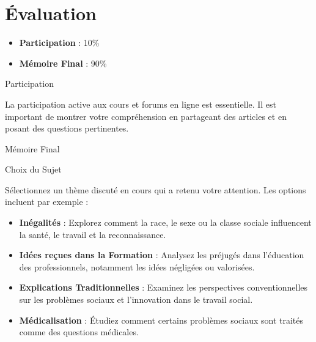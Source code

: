 \documentclass[
  letterpaper,
  DIV=11,
  numbers=noendperiod]{scrreprt}
\providecommand{\tightlist}{%
  \setlength{\itemsep}{0pt}\setlength{\parskip}{0pt}}\usepackage{longtable,booktabs,array}
\newlength{\cslhangindent}
\newenvironment{CSLReferences}[2] %
 {\begin{list}{}{%
  \setlength{\itemindent}{0pt}
  \setlength{\leftmargin}{0pt}
  \setlength{\parsep}{0pt}
  \ifodd #1
   \setlength{\leftmargin}{\cslhangindent}
   \setlength{\itemindent}{-1\cslhangindent}
  \fi
  \setlength{\itemsep}{#2\baselineskip}}}
 {\end{list}}
\begin{document}

\label{refs}
\begin{CSLReferences}{0}{1}
\end{CSLReferences}


\chapter*{Évaluation}\label{uxe9valuation}


\begin{itemize}
\tightlist
\item
  \textbf{Participation} : 10\%\\
\item
  \textbf{Mémoire Final} : 90\%
\end{itemize}

Participation

La participation active aux cours et forums en ligne est essentielle. Il
est important de montrer votre compréhension en partageant des articles
et en posant des questions pertinentes.

Mémoire Final

Choix du Sujet

Sélectionnez un thème discuté en cours qui a retenu votre attention. Les
options incluent par exemple :

\begin{itemize}
\tightlist
\item
  \textbf{Inégalités} : Explorez comment la race, le sexe ou la classe
  sociale influencent la santé, le travail et la reconnaissance.\\
\item
  \textbf{Idées reçues dans la Formation} : Analysez les préjugés dans
  l'éducation des professionnels, notamment les idées négligées ou
  valorisées.\\
\item
  \textbf{Explications Traditionnelles} : Examinez les perspectives
  conventionnelles sur les problèmes sociaux et l'innovation dans le
  travail social.\\
\item
  \textbf{Médicalisation} : Étudiez comment certains problèmes sociaux
  sont traités comme des questions médicales.
\end{itemize}
\end{document}
